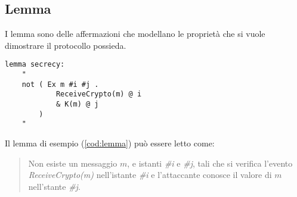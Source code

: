 \subsection{Lemma}
I lemma sono delle affermazioni che modellano le proprietà che si vuole dimostrare il protocollo possieda.

\begin{lstlisting}[caption=Lemma che modella la proprietà di segretezza del messaggio.,
    label=cod:lemma]
lemma secrecy:
    "
    not ( Ex m #i #j .
            ReceiveCrypto(m) @ i
            & K(m) @ j
        )
    "
\end{lstlisting}

Il lemma di esempio (\autoref{cod:lemma}) può essere letto come:
\begin{quote}
    Non esiste un messaggio $m$, e istanti \textit{\#i} e \textit{\#j}, tali che
    si verifica l'evento \textit{ReceiveCrypto(m)} nell'istante  \textit{\#i}
    e l'attaccante conosce il valore di $m$ nell'stante  \textit{\#j}.
\end{quote}

